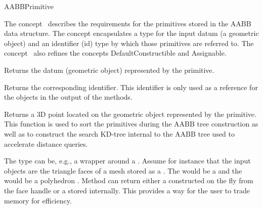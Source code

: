 \ccRefPageBegin


\begin{ccRefConcept}{AABBPrimitive}


\ccDefinition
  
The concept \ccRefName\ describes the requirements for the primitives stored in the AABB data structure. The concept encapsulates a type for the input datum (a geometric object) and an identifier (id) type by which those primitives are referred to. The concept \ccRefName\ also refines the concepts DefaultConstructible and Assignable.

\ccTypes






\ccOperations

{Returns the datum (geometric object) represented by the primitive.}

{Returns the corresponding identifier. This identifier is only used as a reference for the objects in the output of the  methods.}

{Returns a 3D point located on the geometric object represented by the primitive. This function is used to sort the primitives during the AABB tree construction as well as to construct the search KD-tree internal to the AABB tree used to accelerate distance queries.}

\ccSeeAlso
{}

\ccExample

The  type can be, e.g., a wrapper around a . Assume for instance that the input objects are the triangle faces of a mesh stored as a . The  would be a  and the  would be a polyhedron . Method  can return either a  constructed on the fly from the face handle or a  stored internally. This provides a way for the user to trade memory for efficiency.

\end{ccRefConcept}

\ccRefPageEnd

